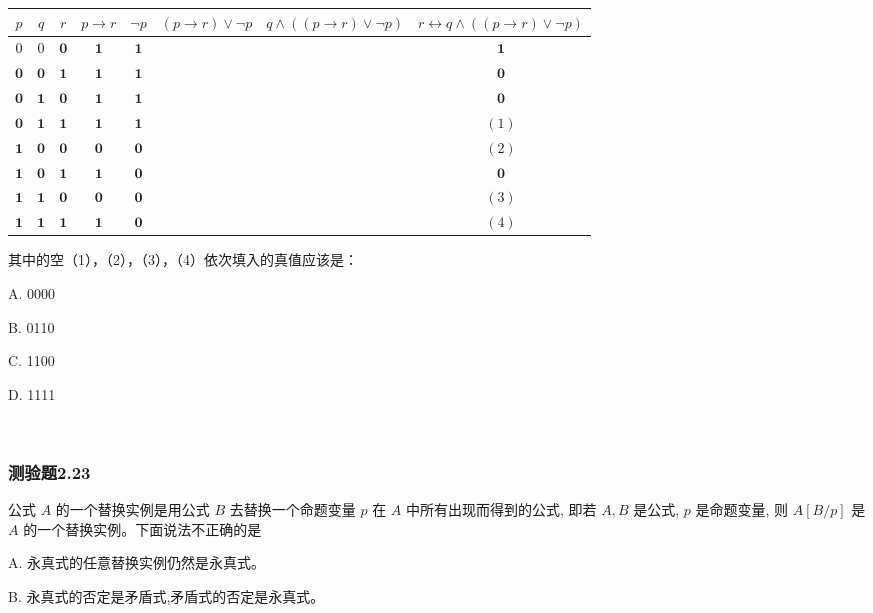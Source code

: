 \documentclass[UTF8, heading=true]{ctexart}
\begin{document}
\begin{table}[H]
  \centering
  \renewcommand{\arraystretch}{1.2}
\begin{tabular}{c|c|c|c|c|c|c|c}
\hline$p$ & $q$ & $r$ & $p \rightarrow r$ & $\neg p$ & $(p \rightarrow r) \vee \neg p$ & $q \wedge((p \rightarrow r) \vee \neg p)$ & $r \leftrightarrow q \wedge((p \rightarrow r) \vee \neg p)$ \\
\hline 0 & 0 & $\mathbf{0}$ & $\mathbf{1}$ & $\mathbf{1}$ & & & $\mathbf{1}$ \\
\hline $\mathbf{0}$ & $\mathbf{0}$ & $\mathbf{1}$ & $\mathbf{1}$ & $\mathbf{1}$ & & & $\mathbf{0}$ \\
\hline $\mathbf{0}$ & $\mathbf{1}$ & $\mathbf{0}$ & $\mathbf{1}$ & $\mathbf{1}$ & & & $\mathbf{0}$ \\
\hline $\mathbf{0}$ & $\mathbf{1}$ & $\mathbf{1}$ & $\mathbf{1}$ & $\mathbf{1}$ & & & $(1)$ \\
\hline $\mathbf{1}$ & $\mathbf{0}$ & $\mathbf{0}$ & $\mathbf{0}$ & $\mathbf{0}$ & & & $(2)$ \\
\hline $\mathbf{1}$ & $\mathbf{0}$ & $\mathbf{1}$ & $\mathbf{1}$ & $\mathbf{0}$ & & & $\mathbf{0}$ \\
\hline $\mathbf{1}$ & $\mathbf{1}$ & $\mathbf{0}$ & $\mathbf{0}$ & $\mathbf{0}$ & & & $(3)$ \\
\hline $\mathbf{1}$ & $\mathbf{1}$ & $\mathbf{1}$ & $\mathbf{1}$ & $\mathbf{0}$ & & & $(4)$ \\
\hline
\end{tabular}
\end{table}

其中的空（1），（2），（3），（4）依次填入的真值应该是： $\qquad$

A. 
0000

B. 
0110

C. 
1100

D.  
1111

\textcolor{white}{答案：D}


\subsubsection{测验题2.23}

公式 $A$ 的一个替换实例是用公式 $B$ 去替换一个命题变量 $p$ 在 $A$ 中所有出现而得到的公式, 即若 $A, B$ 是公式, $p$ 是命题变量, 则 $A[B / p]$ 是 $A$ 的一个替换实例。下面说法不正确的是 $\qquad$

A. 永真式的任意替换实例仍然是永真式。

B. 永真式的否定是矛盾式,矛盾式的否定是永真式。
\end{document}
